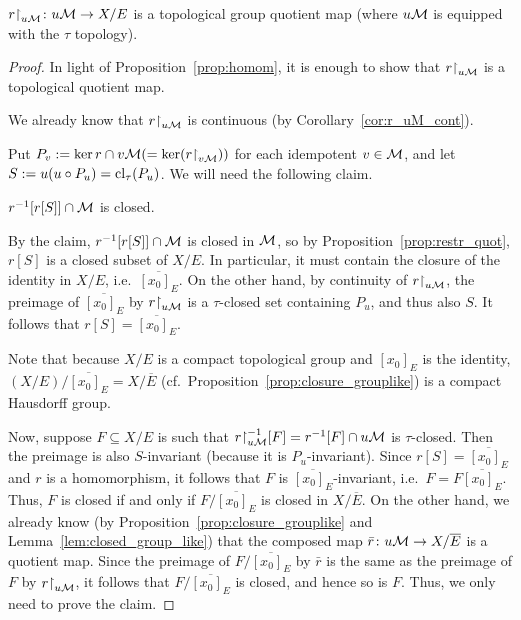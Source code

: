 	
	\begin{lem}
		\label{lem:r_restr_to_top_quot}
		$r\mathord{\upharpoonright}_{u{\mathcal M}}\colon u{\mathcal M}\to X/E$ is a topological group quotient map (where $u{\mathcal M}$ is equipped with the $\tau$ topology).
	\end{lem}
	\begin{proof}
		In light of Proposition~\ref{prop:homom}, it is enough to show that $r\mathord{\upharpoonright}_{u{\mathcal M}}$ is a topological quotient map.
		
		We already know that $r\mathord{\upharpoonright}_{u{\mathcal M}}$ is continuous (by Corollary~\ref{cor:r_uM_cont}).
		
		Put $P_v:=\ker r\cap v{\mathcal M}(=\ker (r\mathord{\upharpoonright}_{v{\mathcal M}}))$ for each idempotent $v\in {\mathcal M}$, and let $S:=u(u\circ P_u)=\operatorname{{cl}}_\tau(P_u)$. We will need the following claim.
		
		\begin{clm*}
			$r^{-1}[r[S]]\cap {\mathcal M}$ is closed.
		\end{clm*}
		By the claim, $r^{-1}[r[S]]\cap {\mathcal M}$ is closed in ${\mathcal M}$, so by Proposition~\ref{prop:restr_quot}, $r[S]$ is a closed subset of $X/E$. In particular, it must contain the closure of the identity in $X/E$, i.e.\ $\overline{[x_0]_E}$. On the other hand, by continuity of $r\mathord{\upharpoonright}_{u{\mathcal M}}$, the preimage of $\overline{[x_0]_E}$ by $r\mathord{\upharpoonright}_{u{\mathcal M}}$ is a $\tau$-closed set containing $P_u$, and thus also $S$. It follows that $r[S]=\overline{[x_0]_E}$.
		
		Note that because $X/E$ is a compact topological group and $[x_0]_E$ is the identity, $(X/E)/\overline{[x_0]_E}=X/{\overline E}$ (cf.\ Proposition~\ref{prop:closure_grouplike}) is a compact Hausdorff group.
		
		Now, suppose $F\subseteq X/E$ is such that $r\mathord{\upharpoonright}_{u{\mathcal M}}^{-1}[F]=r^{-1}[F]\cap u{\mathcal M}$ is $\tau$-closed. Then the preimage is also $S$-invariant (because it is $P_u$-invariant). Since $r[S]=\overline{[x_0]_E}$ and $r$ is a homomorphism, it follows that $F$ is $\overline{[x_0]_E}$-invariant, i.e.\ $F=F\overline{[x_0]_E}$. Thus, $F$ is closed if and only if $F/\overline{[x_0]_E}$ is closed in $X/\overline{E}$. On the other hand, we already know (by Proposition~\ref{prop:closure_grouplike} and Lemma~\ref{lem:closed_group_like}) that the composed map $\bar r\colon u{\mathcal M}\to X/{\overline E}$ is a quotient map. Since the preimage of $F/\overline{[x_0]_E}$ by $\bar r$ is the same as the preimage of $F$ by $r\mathord{\upharpoonright}_{u{\mathcal M}}$, it follows that $F/\overline{[x_0]_E}$ is closed, and hence so is $F$. Thus, we only need to prove the claim.
		

\end{proof}
